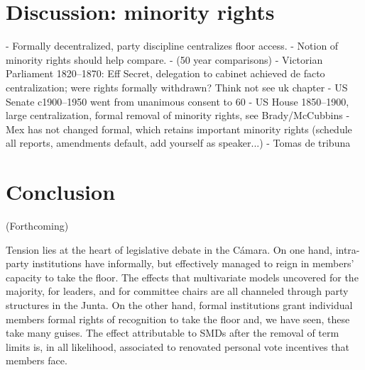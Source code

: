 \documentclass[letter,12pt]{article}
\begin{document}
\section{Discussion: minority rights} %


- Formally decentralized, party discipline centralizes floor access.
- Notion of minority rights should help compare.
- (50 year comparisons)
- Victorian Parliament 1820--1870: Eff Secret, delegation to cabinet achieved de facto centralization; were rights formally withdrawn? Think not see uk chapter
- US Senate c1900--1950 went from unanimous consent to 60%
- US House 1850--1900, large centralization, formal removal of minority rights, see Brady/McCubbins
- Mex has not changed formal, which retains important minority rights (schedule all reports, amendments default, add yourself as speaker...)
- Tomas de tribuna



\section{Conclusion} %

(Forthcoming)


Tension lies at the heart of legislative debate in the Cámara. On one hand, intra-party institutions have informally, but effectively managed to reign in members' capacity to take the floor. The effects that multivariate models uncovered for the majority, for leaders, and for committee chairs are all channeled through party structures in the Junta. On the other hand, formal institutions grant individual members formal rights of recognition to take the floor and, we have seen, these take many guises. The effect attributable to SMDs after the removal of term limits is, in all likelihood, associated to renovated personal vote incentives that members face. 
\end{document}
